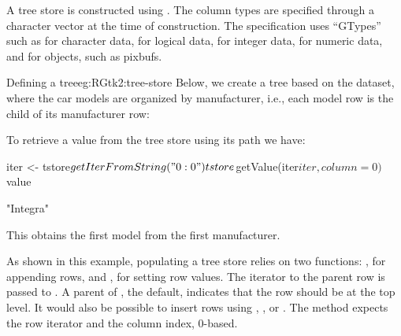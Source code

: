 
A tree store is constructed using . The
column types are specified through a character vector at the time of
construction. The specification uses ``GTypes'' such as
 for character data,  for logical
data,  for integer data,  for numeric data,
and  for \GTK\/ objects, such as pixbufs.

\begin{example}{Defining a tree}{eg:RGtk2:tree-store}
  Below, we create a tree based on the  dataset, where
  the car models are organized by manufacturer, i.e., each model row
  is the child of its manufacturer row:
\begin{Schunk}
\end{Schunk}
  To retrieve a value from the tree store using its path we have:
\begin{Schunk}
\begin{Sinput}
 iter <- tstore$getIterFromString("0:0")
 tstore$getValue(iter$iter, column = 0)$value
\end{Sinput}
\begin{Soutput}
[1] "Integra"
\end{Soutput}
\end{Schunk}
This obtains the first model from the first manufacturer.

\end{example}

As shown in this example, populating a tree store relies on two
functions: , for appending rows, and
, for setting row values. The iterator
to the parent row is passed to . A parent
of , the default, indicates that the row should be at the
top level. It would also be possible to insert rows using
, , or
. The
 method expects the row iterator and
the column index, $0$-based.

